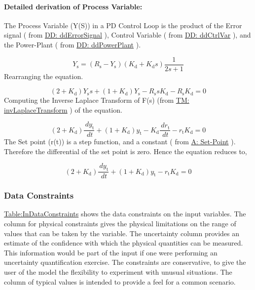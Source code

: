 \documentclass[12pt]{article}
\begin{document}
\paragraph{Detailed derivation of Process Variable:}
\label{IM:pdEquationIMDeriv}
The Process Variable (Y(S)) in a PD Control Loop is the product of the Error signal ( from  \hyperref[DD:ddErrorSignal]{DD: ddErrorSignal} ), Control Variable ( from \hyperref[DD:ddCtrlVar]{DD: ddCtrlVar}  ), and the Power-Plant ( from \hyperref[DD:ddPowerPlant]{DD: ddPowerPlant} ).

\begin{displaymath}
{Y_{\text{s}}}=\left({R_{\text{s}}}-{Y_{\text{s}}}\right) \left({K_{\text{d}}}+{K_{\text{d}}} s\right) \frac{1}{2 s+1}
\end{displaymath}
Rearranging the equation.

\begin{displaymath}
\left(2+{K_{\text{d}}}\right) {Y_{\text{s}}} s+\left(1+{K_{\text{d}}}\right) {Y_{\text{s}}}-{R_{\text{s}}} s {K_{\text{d}}}-{R_{\text{s}}} {K_{\text{d}}}=0
\end{displaymath}
Computing the Inverse Laplace Transform of F(s) (from  \hyperref[TM:invLaplaceTransform]{TM: invLaplaceTransform} ) of the equation.

\begin{displaymath}
\left(2+{K_{\text{d}}}\right) \frac{\,d{y_{\text{t}}}}{\,dt}+\left(1+{K_{\text{d}}}\right) {y_{\text{t}}}-{K_{\text{d}}} \frac{\,d{r_{\text{t}}}}{\,dt}-{r_{\text{t}}} {K_{\text{d}}}=0
\end{displaymath}
The Set point (r(t)) is a step function, and a constant  ( from  \hyperref[setPoint]{A: Set-Point} ). Therefore the  differential of the set point is zero. Hence the equation  reduces to,

\begin{displaymath}
\left(2+{K_{\text{d}}}\right) \frac{\,d{y_{\text{t}}}}{\,dt}+\left(1+{K_{\text{d}}}\right) {y_{\text{t}}}-{r_{\text{t}}} {K_{\text{d}}}=0
\end{displaymath}
\subsubsection{Data Constraints}
\label{Sec:DataConstraints}
\hyperref[Table:InDataConstraints]{Table:InDataConstraints} shows the data constraints on the input variables. The column for physical constraints gives the physical limitations on the range of values that can be taken by the variable. The uncertainty column provides an estimate of the confidence with which the physical quantities can be measured. This information would be part of the input if one were performing an uncertainty quantification exercise. The constraints are conservative, to give the user of the model the flexibility to experiment with unusual situations. The column of typical values is intended to provide a feel for a common scenario.
\end{document}
